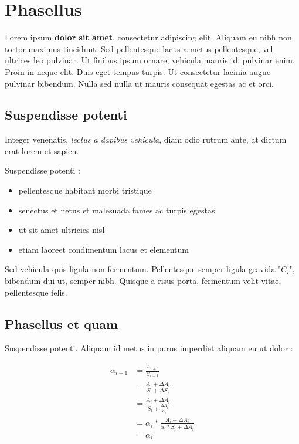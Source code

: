 \newpage 
\section{Phasellus} \label{sec:phasellus}

Lorem ipsum \textbf{dolor sit amet}, consectetur adipiscing elit. Aliquam eu nibh non
tortor maximus tincidunt. Sed pellentesque lacus a metus pellentesque, vel
ultrices leo pulvinar. Ut finibus ipsum ornare, vehicula mauris id, pulvinar
enim. Proin in neque elit. Duis eget tempus turpis. Ut consectetur lacinia
augue pulvinar bibendum. Nulla sed nulla ut mauris consequat egestas ac et orci.

\subsection{Suspendisse potenti}

Integer venenatis, \textit{lectus a dapibus vehicula}, diam odio rutrum ante, at dictum
erat lorem et sapien.

Suspendisse potenti :

\begin{itemize}
\item{pellentesque habitant morbi tristique}
\item{senectus et netus et malesuada fames ac turpis egestas}
\item{ut sit amet ultricies nisl}
\item{etiam laoreet condimentum lacus et elementum}
\end{itemize}

Sed vehicula quis ligula non fermentum. Pellentesque semper ligula gravida "$C_i$",
bibendum dui ut, semper nibh. Quisque a risus porta, fermentum velit vitae,
pellentesque felis.

\newpage
\subsection{Phasellus et quam}

Suspendisse potenti. Aliquam id metus in purus imperdiet aliquam eu ut dolor :

\begin{highlight}
\begin{align}
\alpha_{i+1} &= \frac{A_{i+1}}{S_{i+1}} \\
             &= \frac{A_i + \Delta A_i}{S_i + \Delta S_i} \\
             &= \frac{A_i + \Delta A_i}{S_i + \frac{\Delta A_i}{\alpha_i}} \\
             &= \alpha_i * \frac{A_i + \Delta A_i}{\alpha_i * S_i + \Delta A_i} \\
             &= \alpha_i
\end{align}
\end{highlight}

